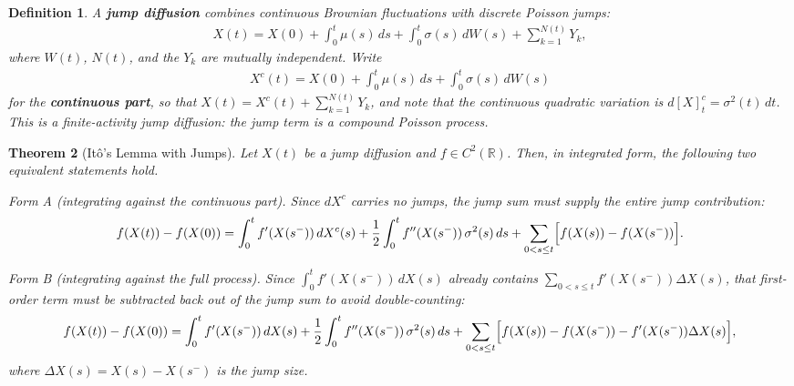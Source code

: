 \documentclass{report}
\theoremstyle{spacedplain}
\newtheorem{theorem}{Theorem}[section]
\theoremstyle{spaceddefinition}
\newtheorem{definition}[theorem]{Definition}
\theoremstyle{spacedremark}
\begin{document}
\begin{definition}
A \textbf{jump diffusion} combines continuous Brownian fluctuations with discrete Poisson jumps:
\begin{align}
    X(t) = X(0) + \int_0^t \mu(s)\, ds + \int_0^t \sigma(s)\, dW(s) + \sum_{k=1}^{N(t)} Y_k,
\end{align}
where $W(t)$, $N(t)$, and the $Y_k$ are mutually independent. Write
\begin{align}
    X^c(t) = X(0) + \int_0^t \mu(s)\,ds + \int_0^t \sigma(s)\,dW(s)
\end{align}
for the \textbf{continuous part}, so that $X(t) = X^c(t) + \sum_{k=1}^{N(t)} Y_k$, and note that the continuous quadratic variation is $d[X]^c_t = \sigma^2(t)\,dt$. This is a finite-activity jump diffusion: the jump term is a compound Poisson process.
\end{definition}

\begin{theorem}[It\^o's Lemma with Jumps]
Let $X(t)$ be a jump diffusion and $f \in C^2(\mathbb{R})$. Then, in integrated form, the following two equivalent statements hold.

\emph{Form A (integrating against the continuous part).} Since $dX^c$ carries no jumps, the jump sum must supply the \emph{entire} jump contribution:
\begin{align}
    f(X(t)) - f(X(0)) = \int_0^t f'(X(s^-))\, dX^c(s) + \frac{1}{2}\int_0^t f''(X(s^-))\, \sigma^2(s)\, ds + \sum_{0 < s \leq t} \Bigl[f(X(s)) - f(X(s^-))\Bigr].
\end{align}

\emph{Form B (integrating against the full process).} Since $\int_0^t f'(X(s^-))\,dX(s)$ already contains $\sum_{0<s\leq t} f'(X(s^-))\Delta X(s)$, that first-order term must be \emph{subtracted back out} of the jump sum to avoid double-counting:
\begin{align}
    f(X(t)) - f(X(0)) = \int_0^t f'(X(s^-))\, dX(s) + \frac{1}{2}\int_0^t f''(X(s^-))\, \sigma^2(s)\, ds + \sum_{0 < s \leq t} \Bigl[f(X(s)) - f(X(s^-)) - f'(X(s^-))\Delta X(s)\Bigr],
\end{align}
where $\Delta X(s) = X(s) - X(s^-)$ is the jump size.
\end{theorem}
\end{document}

